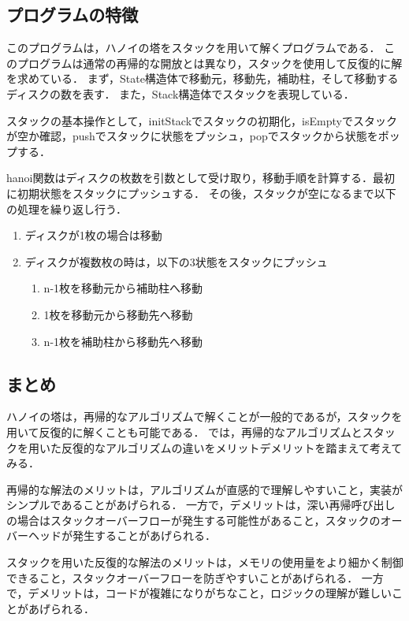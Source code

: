 \documentclass{ltjsarticle}
\begin{document}
\subsection{プログラムの特徴}
このプログラムは，ハノイの塔をスタックを用いて解くプログラムである．
このプログラムは通常の再帰的な開放とは異なり，スタックを使用して反復的に解を求めている．
まず，State構造体で移動元，移動先，補助柱，そして移動するディスクの数を表す．
また，Stack構造体でスタックを表現している．

スタックの基本操作として，initStackでスタックの初期化，isEmptyでスタックが空か確認，pushでスタックに状態をプッシュ，popでスタックから状態をポップする．

hanoi関数はディスクの枚数を引数として受け取り，移動手順を計算する．最初に初期状態をスタックにプッシュする．
その後，スタックが空になるまで以下の処理を繰り返し行う．

\begin{enumerate}
    \item ディスクが1枚の場合は移動
    \item ディスクが複数枚の時は，以下の3状態をスタックにプッシュ
    \begin{enumerate}
        \item n-1枚を移動元から補助柱へ移動
        \item 1枚を移動元から移動先へ移動
        \item n-1枚を補助柱から移動先へ移動
    \end{enumerate}
\end{enumerate}

\subsection{まとめ}
ハノイの塔は，再帰的なアルゴリズムで解くことが一般的であるが，スタックを用いて反復的に解くことも可能である．
では，再帰的なアルゴリズムとスタックを用いた反復的なアルゴリズムの違いをメリットデメリットを踏まえて考えてみる．

再帰的な解法のメリットは，アルゴリズムが直感的で理解しやすいこと，実装がシンプルであることがあげられる．
一方で，デメリットは，深い再帰呼び出しの場合はスタックオーバーフローが発生する可能性があること，スタックのオーバーヘッドが発生することがあげられる．

スタックを用いた反復的な解法のメリットは，メモリの使用量をより細かく制御できること，スタックオーバーフローを防ぎやすいことがあげられる．
一方で，デメリットは，コードが複雑になりがちなこと，ロジックの理解が難しいことがあげられる．
\end{document}
